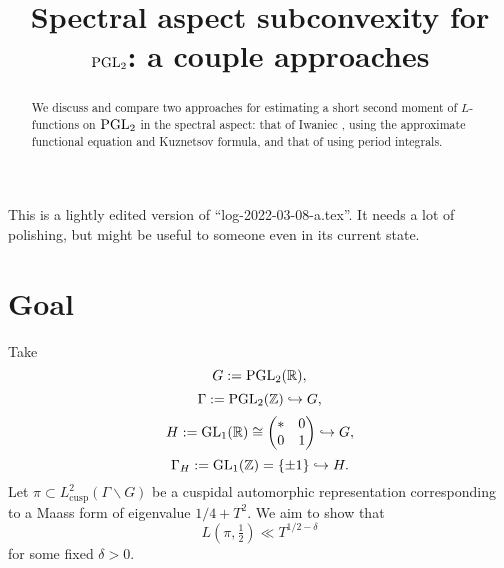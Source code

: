 \documentclass[reqno]{amsart} 
\title{Spectral aspect subconvexity for $\operatorname{PGL}_2$: a couple approaches}
\numberwithin{equation}{section}
\numberwithin{theorem}{section}
\begin{document}
\maketitle
\tableofcontents


\begin{abstract}
  We discuss and compare two approaches for estimating a short second moment of $L$-functions on $\operatorname{PGL}_2$ in the spectral aspect: that of Iwaniec \cite{Iwaniec1992}, using the approximate functional equation and Kuznetsov formula, and that of \cite{2021arXiv210915230N} using period integrals.
\end{abstract}

\begin{remark}
  This is a lightly edited version of ``log-2022-03-08-a.tex''.  It needs a lot of polishing, but might be useful to someone even in its current state.
\end{remark}

\section{Goal}\label{sec:org64b74bb}
Take
\begin{equation*}
G := \operatorname{PGL}_2(\mathbb{R}),
\end{equation*}
\begin{equation*}
\Gamma := \operatorname{PGL}_2(\mathbb{Z}) \hookrightarrow G,
\end{equation*}
\begin{equation*}
  H := \operatorname{GL}_1(\mathbb{R}) \cong  \begin{pmatrix} \ast & 0 \\ 0 & 1 \end{pmatrix} \hookrightarrow G,
\end{equation*}
\begin{equation*}
\Gamma_H := \operatorname{GL}_1(\mathbb{Z}) = \{\pm 1\} \hookrightarrow  H.
\end{equation*}
Let $\pi \subset L^2_{\text{cusp}}(\Gamma \backslash G)$ be a cuspidal automorphic representation corresponding to a Maass form of eigenvalue $1/4 + T^2$.  We aim to show that
\begin{equation}\label{eqn:35ac318817}
  L(\pi,\tfrac{1}{2}) \ll T^{1/2 - \delta}
\end{equation}
for some fixed $\delta > 0$.
\end{document}
